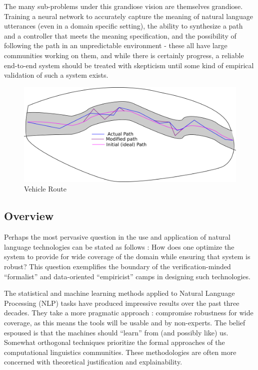 \documentclass[a4paper, 11pt]{article}
\begin{document}
The many sub-problems under this grandiose vision are themselves grandiose.
Training a neural network to accurately capture the meaning of natural language
utterances (even in a domain specific setting), the ability to synthesize a path
and a controller that meets the meaning specification, and the possibility of
following the path in an unpredictable environment - these all have large
communities working on them, and while there is certainly progress, a reliable
end-to-end system should be treated with skepticism until some kind of empirical
validation of such a system exists.

\begin{figure}
\centering
\includegraphics[width=150mm]{pics/diagramTrial1.png}
\caption{Vehicle Route}\label{fig:A2}
\end{figure}

\subsection{Overview}

Perhaps the most pervasive question in the use and application of natural
language technologies can be stated as follows : How does one optimize the
system to provide for wide coverage of the domain while ensuring that system is
robust? This question exemplifies the boundary of the verification-minded
``formalist'' and data-oriented ``empiricist'' camps in designing such
technologies.

The statistical and machine learning methods applied to Natural Language
Processing (NLP) tasks have produced impressive results over the past three decades.
They take a more pragmatic approach : compromise robustness for wide coverage,
as this means the tools will be usable and by non-experts. The belief espoused
is that the machines should ``learn'' from (and possibly like) us. Somewhat orthogonal techniques
prioritize the formal approaches of the computational linguistics communities.
These methodologies are often more concerned with theoretical justification and
explainability.
\end{document}
